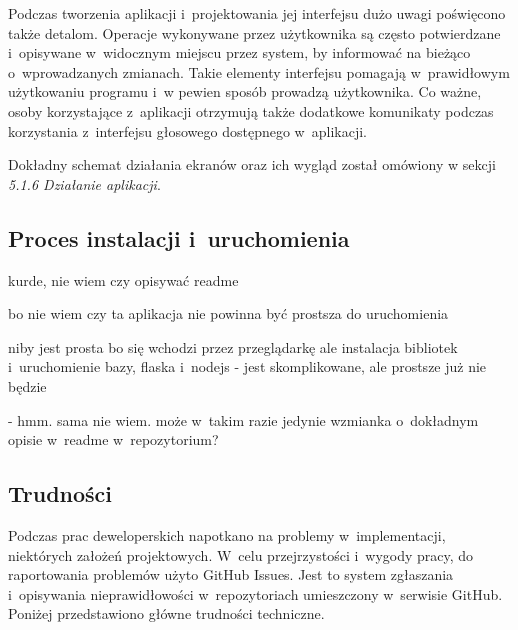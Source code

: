 Podczas tworzenia aplikacji i~projektowania jej interfejsu dużo uwagi poświęcono także detalom. Operacje wykonywane przez użytkownika są często potwierdzane i~opisywane w~widocznym miejscu przez system, by informować na bieżąco o~wprowadzanych zmianach. Takie elementy interfejsu pomagają w~prawidłowym użytkowaniu programu i~w pewien sposób prowadzą użytkownika. Co ważne, osoby korzystające z~aplikacji otrzymują także dodatkowe komunikaty podczas korzystania z~interfejsu głosowego dostępnego w~aplikacji.

Dokładny schemat działania ekranów oraz ich wygląd został omówiony w sekcji \textit{5.1.6 Działanie aplikacji}.



\subsection{Proces instalacji i~uruchomienia}

kurde, nie wiem czy opisywać readme

bo nie wiem czy ta aplikacja nie powinna być prostsza do uruchomienia

niby jest prosta bo się wchodzi przez przeglądarkę ale instalacja bibliotek i~uruchomienie bazy, flaska i~nodejs - jest skomplikowane, ale prostsze już nie będzie 

 - hmm. sama nie wiem. może w~takim razie jedynie wzmianka o~dokładnym opisie w~readme w~repozytorium?






\subsection{Trudności}
Podczas prac deweloperskich napotkano na problemy w~implementacji, niektórych założeń projektowych. W~celu przejrzystości i~wygody pracy, do raportowania problemów użyto GitHub Issues. Jest to system zgłaszania i~opisywania nieprawidłowości w~repozytoriach umieszczony w~serwisie GitHub. Poniżej przedstawiono główne trudności techniczne. 

